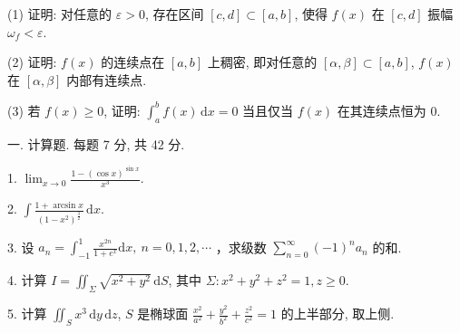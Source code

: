 \documentclass{examcollection}
\begin{document}
{\begin{minipage}{\textwidth}
(1) 证明: 对任意的 $\varepsilon > 0$, 存在区间 $[c, d] \subset [a, b]$, 使得 $f(x)$ 在 $[c, d]$ 振幅 $\omega_f < \varepsilon$.\par
(2) 证明: $f(x)$ 的连续点在 $[a, b]$ 上稠密, 即对任意的 $[\alpha, \beta] \subset [a, b]$, $f(x)$ 在 $[\alpha, \beta]$ 内部有连续点.\par
(3) 若 $f(x) \geq 0$, 证明: $\int_{a}^{b} f(x) \, \mathrm{d}x = 0$ 当且仅当 $f(x)$ 在其连续点恒为 0.\par
{}\smallskip
一. 计算题. 每题 7 分, 共 42 分.\par
1. $\lim_{x\to 0}\frac{1 - (\cos x)^{\sin x}}{x^3}.$\par
2. $\int \frac{1 + \arcsin x}{(1 - x^2)^{\frac{3}{2}}} \, \mathrm{d}x.$\par
3. 设  $a_{n}=\int_{-1}^{1}\frac{x^{2n}}{1+e^{x}}\mathrm{d}x,\ n=0,1,2,\cdots$ ，求级数  $\sum_{n=0}^{\infty}(-1)^{n}a_{n}$  的和.\par
4. 计算 $I = \iint_{\Sigma} \sqrt{x^2 + y^2} \, \mathrm{d}S$, 其中 $\Sigma: x^2 + y^2 + z^2 = 1, z \geq 0$.\par
5. 计算 $\iint_{S} x^{3} \, \mathrm{d}y \, \mathrm{d}z$, $S$ 是椭球面 $\frac{x^{2}}{a^{2}} + \frac{y^{2}}{b^{2}} + \frac{z^{2}}{c^{2}} = 1$ 的上半部分, 取上侧.\par
\end{minipage}}
\ifdim\dimexpr\ht\proofbox+\dp\proofbox\relax>\textheight
\noindent\resizebox{!}{\textheight}{\usebox{\proofbox}}\else\noindent\usebox{\proofbox}\fi\clearpage
\end{document}

